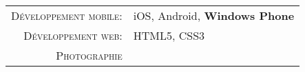 %
%
%

\begin{tabular}{rl}
    \textsc{Développement mobile:} & iOS, Android, \textbf{Windows Phone}\\
    \textsc{Développement web:} & HTML5, CSS3 \\ 
    \textsc{Photographie} & \\
\end{tabular}